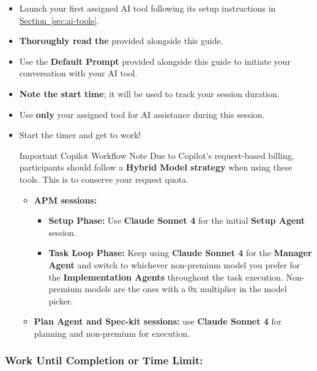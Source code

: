 \documentclass[11pt, a4paper]{article}
\newcommand{\inlinecode}[1]{%
    \raisebox{-0.2ex}{%
    \tcbox[
        enhanced,
        nobeforeafter,
        colback=codebackground,
        colframe=codebordercolor,
        coltext=codetextcolor,
        boxrule=0.5pt,
        arc=2pt,
        boxsep=0pt,
        left=0.8mm,
        right=0.8mm,
        top=0.3mm,
        bottom=0.3mm,
        fontupper=\ttfamily\small\color{codetextcolor}
    ]{#1}%
    }%
}
\begin{document}
    \begin{itemize}
        \item Launch your first assigned AI tool following its setup instructions in \hyperref[sec:ai-tools]{Section~\ref*{sec:ai-tools}}.
        \item \textbf{Thoroughly read the} \inlinecode{PRD.md} provided alongside this guide.
        \item Use the \textbf{Default Prompt} provided alongside this guide to initiate your conversation with your AI tool.
        \item \textbf{Note the start time}; it will be used to track your session duration.
        \item Use \textbf{only} your assigned tool for AI assistance during this session.
        \item Start the timer and get to work!
        \begin{mainbox}{Important Copilot Workflow Note}
            Due to Copilot's request-based billing, participants should follow a \textbf{Hybrid Model strategy} when using these tools. This is to conserve your request quota.
            \begin{itemize}
                \item \textbf{APM sessions:}
                \begin{itemize}
                    \item \textbf{Setup Phase:} Use \textbf{Claude Sonnet 4} for the initial \textbf{Setup Agent} session.
                    \item \textbf{Task Loop Phase:} Keep using \textbf{Claude Sonnet 4} for the \textbf{Manager Agent} and switch to whichever non-premium model you prefer for the \textbf{Implementation Agents} throughout the task execution. Non-premium models are the ones with a 0x multiplier in the model picker.
                \end{itemize}
                \vspace{0.5em}
                \item \textbf{Plan Agent and Spec-kit sessions:} use \textbf{Claude Sonnet 4} for planning and non-premium for execution.
            \end{itemize}
        \end{mainbox}
    \end{itemize}
        
\subsubsection*{Work Until Completion or Time Limit:}
    
\end{document}
